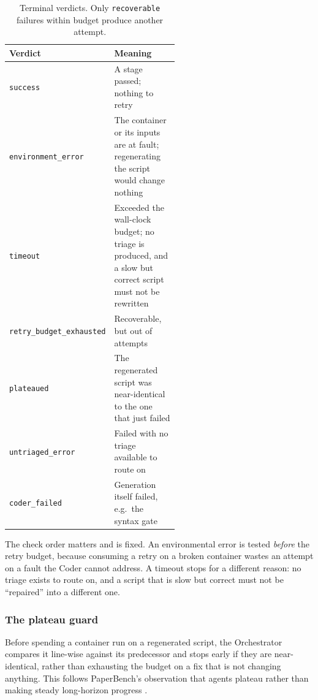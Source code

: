 \documentclass[11pt]{article}
\begin{document}
\begin{table}[htbp]
\centering
\small
\caption{Terminal verdicts. Only \texttt{recoverable} failures within budget produce
another attempt.}
\label{tab:verdicts}
\begin{tabular}{lp{0.55\linewidth}}
\toprule
Verdict & Meaning \\
\midrule
\texttt{success}                & A stage passed; nothing to retry \\
\texttt{environment\_error}     & The container or its inputs are at fault; regenerating
                                  the script would change nothing \\
\texttt{timeout}                & Exceeded the wall-clock budget; no triage is produced,
                                  and a slow but correct script must not be rewritten \\
\texttt{retry\_budget\_exhausted} & Recoverable, but out of attempts \\
\texttt{plateaued}              & The regenerated script was near-identical to the one
                                  that just failed \\
\texttt{untriaged\_error}       & Failed with no triage available to route on \\
\texttt{coder\_failed}          & Generation itself failed, e.g.\ the syntax gate \\
\bottomrule
\end{tabular}
\end{table}

The check order matters and is fixed. An environmental error is tested \emph{before} the
retry budget, because consuming a retry on a broken container wastes an attempt on a fault
the Coder cannot address. A timeout stops for a different reason: no triage exists to
route on, and a script that is slow but correct must not be ``repaired'' into a different
one.

\subsubsection{The plateau guard}

Before spending a container run on a regenerated script, the Orchestrator compares it
line-wise against its predecessor and stops early if they are near-identical, rather than
exhausting the budget on a fix that is not changing anything. This follows PaperBench's
observation that agents plateau rather than making steady long-horizon progress
\cite{starace2025paperbench}.
\end{document}
